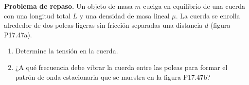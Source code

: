 \item \textbf{Problema de repaso.}
Un objeto de masa $m$ cuelga en equilibrio de una cuerda con una longitud total $L$ y una densidad de masa lineal $\mu$. La cuerda se enrolla alrededor de dos poleas ligeras sin fricción separadas una distancia $d$ (figura P17.47a).
\begin{enumerate}
    \item Determine la tensión en la cuerda.
    \item ¿A qué frecuencia debe vibrar la cuerda entre las poleas para formar el patrón de onda estacionaria que se muestra en la figura P17.47b?
\end{enumerate}